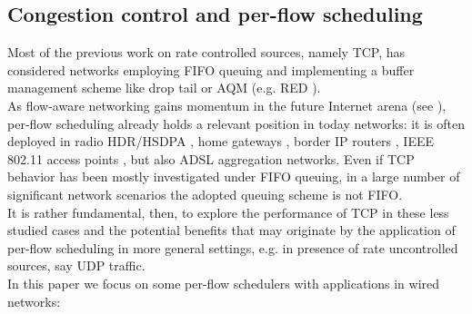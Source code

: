 \documentclass[a4paper,oneside, 11pt]{article}
\begin{document}
\subsection{Congestion control and per-flow scheduling}
Most of the previous work on rate controlled sources, namely TCP, has considered networks
employing FIFO queuing and implementing a buffer management scheme like drop tail or AQM (e.g. RED \cite{misra}).\\
As flow-aware networking gains momentum in the future Internet arena (see \cite{nick09}), per-flow scheduling
already holds a relevant position in today networks:  it is often deployed in
radio HDR/HSDPA \cite{umts}, home gateways \cite{ostallo,sqf-demo}, border IP routers \cite{hpsr,ancs05},
IEEE 802.11 access points \cite{tan}, but also ADSL aggregation networks.
Even if TCP behavior has been mostly  investigated under FIFO queuing, in
a large number of
significant network scenarios the adopted queuing scheme is not FIFO.\\
It is rather fundamental, then, to explore the performance of TCP in these less studied
cases and the potential benefits that may originate by the application of per-flow scheduling
in more general settings, e.g. in presence of rate
uncontrolled sources, say UDP traffic.\\
In this paper we focus on some per-flow schedulers with applications in wired networks:
\end{document}
